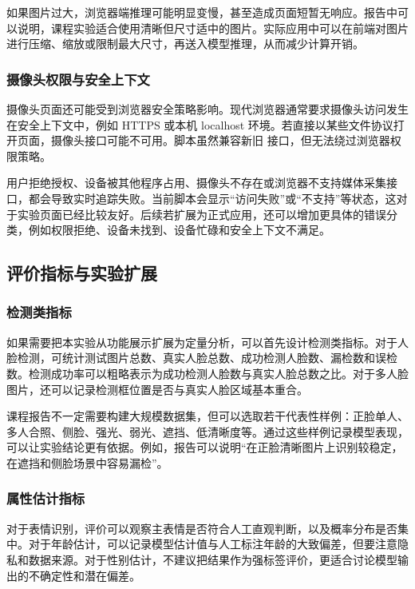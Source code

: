 如果图片过大，浏览器端推理可能明显变慢，甚至造成页面短暂无响应。报告中可以说明，课程实验适合使用清晰但尺寸适中的图片。实际应用中可以在前端对图片进行压缩、缩放或限制最大尺寸，再送入模型推理，从而减少计算开销。

\subsubsection{摄像头权限与安全上下文}

摄像头页面还可能受到浏览器安全策略影响。现代浏览器通常要求摄像头访问发生在安全上下文中，例如 HTTPS 或本机 localhost 环境。若直接以某些文件协议打开页面，摄像头接口可能不可用。脚本虽然兼容新旧  接口，但无法绕过浏览器权限策略。

用户拒绝授权、设备被其他程序占用、摄像头不存在或浏览器不支持媒体采集接口，都会导致实时追踪失败。当前脚本会显示“访问失败”或“不支持”等状态，这对于实验页面已经比较友好。后续若扩展为正式应用，还可以增加更具体的错误分类，例如权限拒绝、设备未找到、设备忙碌和安全上下文不满足。

\subsection{评价指标与实验扩展}

\subsubsection{检测类指标}

如果需要把本实验从功能展示扩展为定量分析，可以首先设计检测类指标。对于人脸检测，可统计测试图片总数、真实人脸总数、成功检测人脸数、漏检数和误检数。检测成功率可以粗略表示为成功检测人脸数与真实人脸总数之比。对于多人脸图片，还可以记录检测框位置是否与真实人脸区域基本重合。

课程报告不一定需要构建大规模数据集，但可以选取若干代表性样例：正脸单人、多人合照、侧脸、强光、弱光、遮挡、低清晰度等。通过这些样例记录模型表现，可以让实验结论更有依据。例如，报告可以说明“在正脸清晰图片上识别较稳定，在遮挡和侧脸场景中容易漏检”。

\subsubsection{属性估计指标}

对于表情识别，评价可以观察主表情是否符合人工直观判断，以及概率分布是否集中。对于年龄估计，可以记录模型估计值与人工标注年龄的大致偏差，但要注意隐私和数据来源。对于性别估计，不建议把结果作为强标签评价，更适合讨论模型输出的不确定性和潜在偏差。

